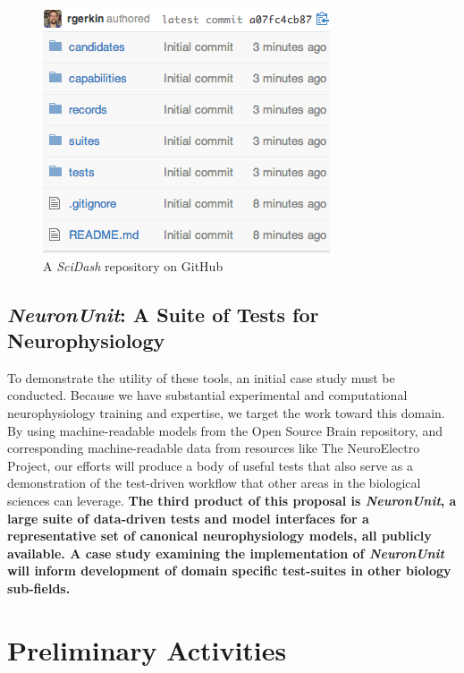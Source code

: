 \documentclass[11pt,letterpaper]{article}
\begin{document}
\begin{figure}
\includegraphics[scale=0.7]{scidash_github.png}
\caption{A \textit{SciDash} repository on GitHub}
\label{fig:scidash_repo}
\end{figure}
\leavevmode
{}

\subsection{\textit{NeuronUnit}: A Suite of Tests for Neurophysiology}\label{sec:NeuronUnit}
To demonstrate the utility of these tools, an initial case study must be conducted. Because we have substantial experimental and computational neurophysiology training and expertise, we target the work toward this domain. By using machine-readable models from the Open Source Brain repository, and corresponding machine-readable data from resources like The NeuroElectro Project\cite{neuroelectro_url}, our efforts will produce a body of useful tests that also serve as a demonstration of the test-driven workflow that other areas in the biological sciences can leverage.  \textbf{The third product of this proposal is \textit{NeuronUnit}, a large suite of data-driven tests and model interfaces for a representative set of canonical neurophysiology models, all publicly available. A case study examining the implementation of \textit{NeuronUnit} will inform development of domain specific test-suites in other biology sub-fields.}

\section{Preliminary Activities}
\end{document}
